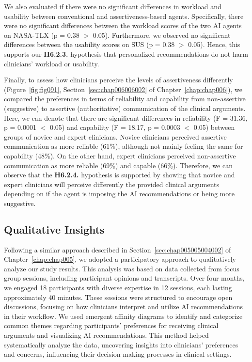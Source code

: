 We also evaluated if there were no significant differences in workload and usability between conventional and assertiveness-based agents.
Specifically, there were no significant differences between the workload scores of the two \ac{AI} agents on \ac{NASA-TLX} (p = 0.38 $>$ 0.05).
Furthermore, we observed no significant differences between the usability scores on \ac{SUS} (p = 0.38 $>$ 0.05).
\textcolor{revised}{Hence, this supports our {\bf H6.2.3.} hypothesis that personalized recommendations do not harm clinicians' workload or usability.}

Finally, to assess how clinicians perceive the levels of assertiveness differently (Figure~\ref{fig:fig091}, Section~\ref{sec:chap006006002} of Chapter~\ref{chap:chap006}), we compared the preferences in terms of reliability and capability from non-assertive (suggestive) to assertive (authoritative) communication of the clinical arguments.
Here, we can denote that there are significant differences in reliability (F = 31.36, p = 0.0001 $<$ 0.05) and capability (F = 18.17, p = 0.0003 $<$ 0.05) between groups of novice and expert clinicians.
Novice clinicians perceived assertive communication as more reliable (61\%), although not mainly feeling the same for capability (48\%).
On the other hand, expert clinicians perceived non-assertive communication as more reliable (69\%) and capable (66\%).
Therefore, we can observe that the {\bf H6.2.4.} hypothesis is supported by showing that novice and expert clinicians will perceive differently the provided clinical arguments depending on if the agent is imposing the \ac{AI} recommendations or being more suggestive.

\subsection{Qualitative Insights}
\label{sec:app005007003}

\textcolor{revised}{Following a similar approach described in Section~\ref{sec:chap005005004002} of Chapter~\ref{chap:chap005}, we adopted a participatory approach to qualitatively analyze our study results.
This analysis was based on data collected from focus group sessions, including participant opinions and transcripts.
Over four months, we engaged 18 participants with diverse expertise in 12 sessions, each lasting approximately 40 minutes.
These sessions were structured to encourage open discussions, focusing on how clinicians interpret and utilize \ac{AI} recommendations in their workflow.
We used emergent affinity diagrams to identify and categorize common themes regarding participants' preferences for receiving clinical arguments and visualizing \ac{AI} recommendations.
This method helped systematically analyze the data, uncovering insights into clinicians' preferences and concerns, influencing their decision-making processes in clinical settings.}

